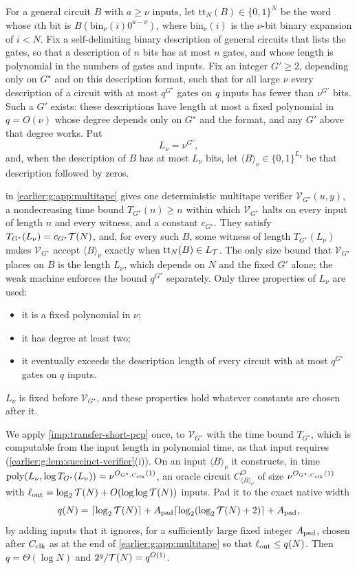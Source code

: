 For a general circuit $B$ with
$a\ge\nu$ inputs, let $\mathrm{tt}_N(B)\in\{0,1\}^N$ be the word whose
$i$th bit is $B(\mathrm{bin}_\nu(i)0^{a-\nu})$, where
$\mathrm{bin}_\nu(i)$ is the $\nu$-bit binary expansion of $i<N$. Fix a
self-delimiting binary description of general circuits that lists the
gates, so that a description of $n$ bits has at most $n$ gates, and
whose length is polynomial in the numbers of gates and inputs. Fix an integer
$G'\ge2$, depending only on ${G^\star}$ and on this description format, such
that for all large $\nu$ every description of a circuit with at most
$q^{G^\star}$ gates on $q$ inputs has fewer than $\nu^{G'}$ bits. Such a $G'$
exists: these descriptions have length at most a fixed polynomial in
$q=O(\nu)$ whose degree depends only on ${G^\star}$ and the format, and any $G'$
above that degree works. Put
\[
 L_\nu=\nu^{G'},
\]
and, when the description of $B$ has at most $L_\nu$ bits, let
$\langle B\rangle_\nu\in\{0,1\}^{L_\nu}$ be that description followed by
zeros.

 in \cref{earlier:g:app:multitape} gives one
deterministic multitape verifier $\mathcal V_{{G^\star}}(u,y)$, a nondecreasing
time bound $T_{{G^\star}}(n)\ge n$ within which $\mathcal V_{{G^\star}}$ halts on every input
of length $n$ and every witness, and a constant $c_{{G^\star}}$. They satisfy
$T_{{G^\star}}(L_\nu)=c_{{G^\star}}\mathcal T(N)$, and, for every such $B$, some witness of length
$T_{{G^\star}}(L_\nu)$ makes $\mathcal V_{{G^\star}}$ accept $\langle B\rangle_\nu$ exactly
when $\mathrm{tt}_N(B)\in L_{\mathcal T}$. The only size bound that
$\mathcal V_{{G^\star}}$ places on $B$ is the length $L_\nu$, which depends on
$N$ and the fixed $G'$ alone; the weak machine enforces the bound $q^{G^\star}$
separately. Only three properties of $L_\nu$ are used:
\begin{itemize}
\item it is a fixed polynomial in $\nu$;
\item it has degree at least two;
\item it eventually exceeds the description length of every circuit
with at most $q^{G^\star}$ gates on $q$ inputs.
\end{itemize}
$L_\nu$ is fixed before $\mathcal V_{{G^\star}}$, and these
properties hold whatever constants are chosen after it.

We apply \cref{imp:transfer-short-pcp} once, to $\mathcal V_{{G^\star}}$ with the time bound
$T_{{G^\star}}$, which is computable from the input length in polynomial time, as
that input requires (\cref{earlier:g:lem:succinct-verifier}(i)). On an input $\langle B\rangle_\nu$ it constructs, in time
$\operatorname{poly}(L_\nu,\log T_{{G^\star}}(L_\nu))=\nu^{O_{{G^\star},C_{\rm clk}}(1)}$, an oracle circuit
$C^O_{\langle B\rangle_\nu}$ of size $\nu^{O_{{G^\star},C_{\rm clk}}(1)}$ with
$\ell_{\rm out}=\log_2\mathcal T(N)+O(\log\log\mathcal T(N))$ inputs. Pad it to the
exact native width
\[
 q(N)=\lceil\log_2\mathcal T(N)\rceil+
 A_{\rm pad}\lceil\log_2(\log_2\mathcal T(N)+2)\rceil+A_{\rm pad},
\]
by adding inputs that it ignores, for a sufficiently large fixed integer
$A_{\rm pad}$, chosen after $C_{\rm clk}$ as at the end of
\cref{earlier:g:app:multitape} so that $\ell_{\rm out}\le q(N)$. Then
$q=\Theta(\log N)$ and $2^q/\mathcal T(N)=q^{O(1)}$.


